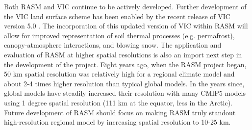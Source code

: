 Both RASM and VIC continue to be actively developed.
Further development of the VIC land surface scheme has been enabled by the recent release of VIC version 5.0 \citep[see also \label{sec:vic_dev}]{Hamman_2016c,Hamman_2016d}.
The incorporation of this updated version of VIC within RASM will allow for improved representation of soil thermal processes (e.g. permafrost), canopy-atmosphere interactions, and blowing snow.
The application and evaluation of RASM at higher spatial resolutions is also an import next step in the development of the project.
Eight years ago, when the RASM project began, 50 km spatial resolution was relatively high for a regional climate model and about 2-4 times higher resolution than typical global models.
In the years since, global models have steadily increased their resolution with many CMIP5 models using 1 degree spatial resolution (111 km at the equator, less in the Arctic).
Future development of RASM should focus on making RASM truly standout high-resolution regional model by increasing spatial resolution to 10-25 km.
